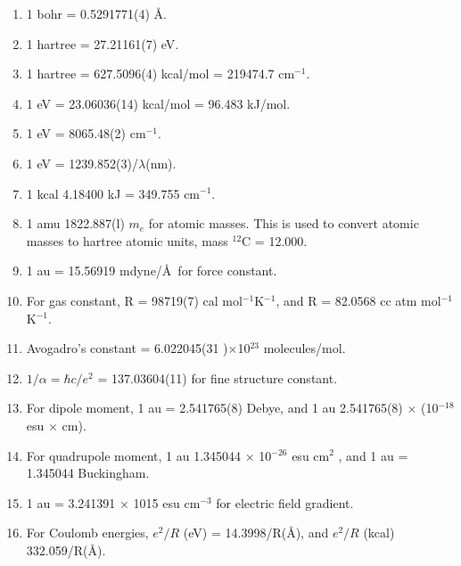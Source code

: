 \begin{enumerate}
\item 1 bohr = 0.5291771(4) \AA. 

\item 1 hartree = 27.21161(7) eV.
    
\item 1 hartree = 627.5096(4) kcal/mol = 219474.7 cm$^{-1}$. 

\item 1 eV = 23.06036(14) kcal/mol = 96.483 kJ/mol.
    
\item 1 eV = 8065.48(2) cm$^{-1}$.

\item 1 eV = 1239.852(3)/$\lambda$(nm).
    
\item 1 kcal 4.18400 kJ = 349.755 cm$^{-1}$.
    
\item 1 amu 1822.887(l) $m_e$ for atomic masses. This is used to convert 
atomic masses to hartree atomic units, mass $^{12}$C = 12.000.
    
\item 1 au = 15.56919 mdyne/\AA\ for force constant.
    
\item For gas constant, R = 98719(7) cal mol$^{-1}$K$^{-1}$, and 
R = 82.0568 cc atm mol$^{-1}$K$^{-1}$.

\item Avogadro's constant = 6.022045(31 )$\times$10$^{23}$ molecules/mol.

\item $1 / \alpha = \hbar c /e^2$ = 137.03604(11) for fine structure constant.

\item For dipole moment, 1 au = 2.541765(8) Debye, and 1 au
2.541765(8) $\times$ (10$^{-18}$ esu $\times$ cm).

\item For quadrupole moment, 1 au 1.345044 $\times$ 10$^{-26}$ esu
cm$^2$ , and 1 au = 1.345044 Buckingham.

\item 1 au = 3.241391 $\times$ 1015 esu cm$^{-3}$ for electric field gradient.

\item For Coulomb energies, $e^2 / R$ (eV) = 14.3998/R(\AA), and 
$e^2 / R$ (kcal) 332.059/R(\AA).
\end{enumerate}